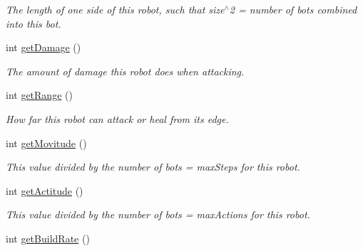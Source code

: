 \begin{DoxyCompactItemize}
\begin{DoxyCompactList}\small\item\em The length of one side of this robot, such that size$^\wedge$2 = number of bots combined into this bot. \item\end{DoxyCompactList}\item 
\hypertarget{classBot_aee79f194c39cf4b2644bfe4bb9935fb6}{
int \hyperlink{classBot_aee79f194c39cf4b2644bfe4bb9935fb6}{getDamage} ()}
\label{classBot_aee79f194c39cf4b2644bfe4bb9935fb6}

\begin{DoxyCompactList}\small\item\em The amount of damage this robot does when attacking. \item\end{DoxyCompactList}\item 
\hypertarget{classBot_a7234ac107af9b2c50f6b286efe9fa3b5}{
int \hyperlink{classBot_a7234ac107af9b2c50f6b286efe9fa3b5}{getRange} ()}
\label{classBot_a7234ac107af9b2c50f6b286efe9fa3b5}

\begin{DoxyCompactList}\small\item\em How far this robot can attack or heal from its edge. \item\end{DoxyCompactList}\item 
\hypertarget{classBot_a6a9a3c01bb0ac1bf145da57fd8aa403f}{
int \hyperlink{classBot_a6a9a3c01bb0ac1bf145da57fd8aa403f}{getMovitude} ()}
\label{classBot_a6a9a3c01bb0ac1bf145da57fd8aa403f}

\begin{DoxyCompactList}\small\item\em This value divided by the number of bots = maxSteps for this robot. \item\end{DoxyCompactList}\item 
\hypertarget{classBot_aa6917c2c7957ee5faf6f751a77ce0761}{
int \hyperlink{classBot_aa6917c2c7957ee5faf6f751a77ce0761}{getActitude} ()}
\label{classBot_aa6917c2c7957ee5faf6f751a77ce0761}

\begin{DoxyCompactList}\small\item\em This value divided by the number of bots = maxActions for this robot. \item\end{DoxyCompactList}\item 
\hypertarget{classBot_ab1e65bdf5d66c72a2fd3e786737acf88}{
int \hyperlink{classBot_ab1e65bdf5d66c72a2fd3e786737acf88}{getBuildRate} ()}
\label{classBot_ab1e65bdf5d66c72a2fd3e786737acf88}


\end{DoxyCompactItemize}
